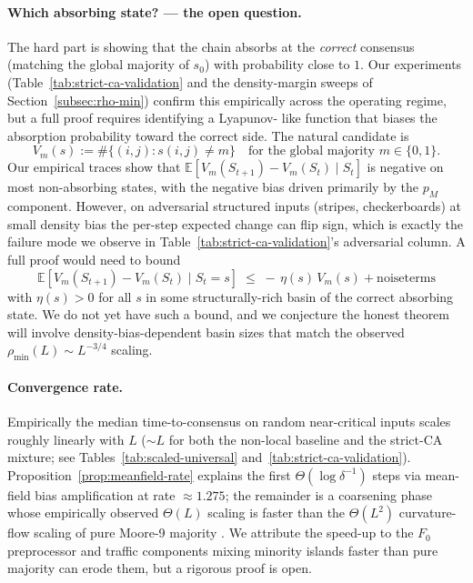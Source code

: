 \documentclass[11pt,a4paper]{article}
\begin{document}
\paragraph{Which absorbing state? --- the open question.}
The hard part is showing that the chain absorbs at the
\emph{correct} consensus (matching the global majority of \(s_0\))
with probability close to \(1\).  Our experiments
(Table~\ref{tab:strict-ca-validation} and the density-margin sweeps
of Section~\ref{subsec:rho-min}) confirm this empirically across the
operating regime, but a full proof requires identifying a Lyapunov-
like function that biases the absorption probability toward the
correct side.  The natural candidate is
\[
V_m(s) := \#\{(i,j) : s(i,j) \neq m\}
\quad\text{for the global majority }m \in \{0,1\}.
\]
Our empirical traces show that \(\mathbb{E}[V_m(S_{t+1}) - V_m(S_t)
\mid S_t]\) is negative on most non-absorbing states, with the
negative bias driven primarily by the \(p_M\) component.  However,
on adversarial structured inputs (stripes, checkerboards) at small
density bias the per-step expected change can flip sign, which is
exactly the failure mode we observe in
Table~\ref{tab:strict-ca-validation}'s adversarial column.  A full
proof would need to bound
\[
\mathbb{E}[V_m(S_{t+1}) - V_m(S_t) \mid S_t = s]
\;\leq\;-\,\eta(s)\,V_m(s) + \mathrm{noise terms}
\]
with \(\eta(s) > 0\) for all \(s\) in some structurally-rich basin of
the correct absorbing state.  We do not yet have such a bound, and
we conjecture the honest theorem will involve density-bias-dependent
basin sizes that match the observed \(\rho_{\min}(L) \sim L^{-3/4}\)
scaling.

\paragraph{Convergence rate.}
Empirically the median time-to-consensus on random near-critical
inputs scales roughly linearly with \(L\) (\(\sim L\) for both the
non-local baseline and the strict-CA mixture; see
Tables~\ref{tab:scaled-universal} and~\ref{tab:strict-ca-validation}).
Proposition~\ref{prop:meanfield-rate} explains the first
\(\Theta(\log \delta^{-1})\) steps via mean-field bias amplification
at rate \(\approx 1.275\); the remainder is a coarsening phase whose
empirically observed \(\Theta(L)\) scaling is faster than the
\(\Theta(L^2)\) curvature-flow scaling of pure Moore-9 majority
\cite{FatesRegnault2016}.  We attribute the speed-up to the \(F_0\)
preprocessor and traffic components mixing minority islands faster
than pure majority can erode them, but a rigorous proof is open.
\end{document}
